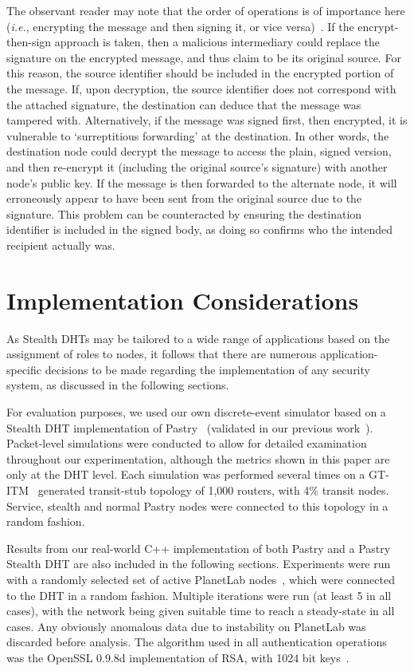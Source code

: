 \documentclass{elsart3p}
\begin{document}
The observant reader may note that the order of operations is of
importance here (\emph{i.e.}, encrypting the message and then
signing it, or vice versa)~\cite{Davis01Defective}. If the encrypt-then-sign approach is
taken, then a malicious intermediary could replace the signature on
the encrypted message, and thus claim to be its original source. For
this reason, the source identifier should be included
in the encrypted portion of the message. If, upon decryption, the
source identifier does not correspond with the attached signature, the
destination can deduce that the message was tampered with.
Alternatively, if the message was signed first, then encrypted, it
is vulnerable to `surreptitious forwarding' at the destination. In
other words, the destination node could decrypt the message to
access the plain, signed version, and then re-encrypt it (including
the original source's signature) with another node's public key. If
the message is then forwarded to the alternate node, it will erroneously appear to have been sent
from the original source due to the signature. This
problem can be counteracted by ensuring the destination
identifier is included in the signed body, as doing so confirms who
the intended recipient actually was.

\section{Implementation Considerations}
\label{sect-considerations}

As Stealth DHTs may be tailored to a wide range of applications
based on the assignment of roles to nodes, it follows that there are
numerous application-specific decisions to be made regarding the
implementation of any security system, as discussed in the following
sections.

For evaluation purposes, we used our own discrete-event simulator
based on a Stealth DHT implementation of
Pastry~\cite{Rowstron01Pastry} (validated in our previous
work~\cite{Brampton06Stealth}). Packet-level simulations were
conducted to allow for detailed examination throughout our
experimentation, although the metrics shown in this paper are only at
the DHT level. Each simulation was performed several times on a
GT-ITM~\cite{Calvert97Modeling} generated transit-stub topology of
1,000 routers, with 4\% transit nodes. Service, stealth and normal
Pastry nodes were connected to this topology in a random fashion.

Results from our real-world C++ implementation of both Pastry and a
Pastry Stealth DHT are also included in the following sections. Experiments
were run with a randomly selected set of active PlanetLab
nodes~\cite{planetlab}, which were connected to the DHT in a random
fashion. Multiple iterations were run (at least 5 in all cases),
with the network being given suitable time to reach a steady-state in all cases. Any obviously
anomalous data due to instability on PlanetLab was discarded before
analysis. The algorithm used in all authentication operations was
the OpenSSL 0.9.8d implementation of RSA, with 1024 bit
keys~\cite{openssl,Rivest78Method}.
\end{document}

